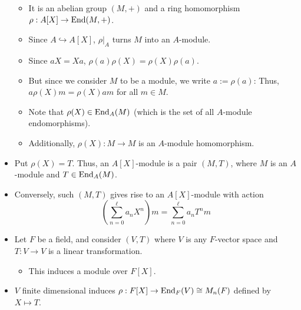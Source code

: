 \documentclass[../notes.tex]{subfiles}
\begin{document}
\begin{itemize}
    \begin{itemize}
        \item It is an abelian group $(M,+)$ and a ring homomorphism $\rho:A[X]\to\operatorname{End}(M,+)$.
        \item Since $A\hookrightarrow A[X]$, $\rho|_A$ turns $M$ into an $A$-module.
        \item Since $aX=Xa$, $\rho(a)\rho(X)=\rho(X)\rho(a)$.
        \item But since we consider $M$ to be a module, we write $a:=\rho(a)$: Thus, $a\rho(X)m=\rho(X)am$ for all $m\in M$.
        \item Note that $\rho(X)\in\operatorname{End}_A(M)$ (which is the set of all $A$-module endomorphisms).
        \item Additionally, $\rho(X):M\to M$ is an $A$-module homomorphism.
    \end{itemize}
    \item Put $\rho(X)=T$. Thus, an $A[X]$-module is a pair $(M,T)$, where $M$ is an $A$-module and $T\in\operatorname{End}_A(M)$.
    \item Conversely, such $(M,T)$ gives rise to an $A[X]$-module with action
    \begin{equation*}
        \left( \sum_{n=0}^\ell a_nX^n \right)m = \sum_{n=0}^\ell a_nT^nm
    \end{equation*}
    \item Let $F$ be a field, and consider $(V,T)$ where $V$ is any $F$-vector space and $T:V\to V$ is a linear transformation.
    \begin{itemize}
        \item This induces a module over $F[X]$.
    \end{itemize}
    \item $V$ finite dimensional induces $\rho:F[X]\to\operatorname{End}_F(V)\cong M_n(F)$ defined by $X\mapsto T$.
    \begin{figure}[H]
        \centering
\end{figure}
\end{itemize}
\end{document}
